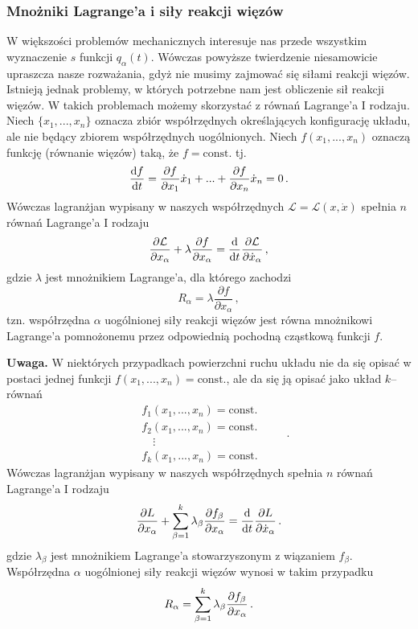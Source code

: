 \documentclass[../main.tex]{subfiles}
\begin{document}
\subsubsection{Mnożniki Lagrange'a i siły reakcji więzów}
W większości problemów mechanicznych interesuje nas przede wszystkim wyznaczenie \(s\) funkcji \(q_\alpha(t)\). Wówczas powyższe twierdzenie niesamowicie upraszcza nasze rozważania, gdyż nie musimy zajmować się siłami reakcji więzów. Istnieją jednak problemy, w których potrzebne nam jest obliczenie sił reakcji więzów. W takich problemach możemy skorzystać z równań Lagrange'a I rodzaju. Niech \(\{x_1,...,x_n\}\) oznacza zbiór współrzędnych określających konfigurację układu, ale nie będący zbiorem współrzędnych uogólnionych. Niech \(f(x_1,...,x_n)\) oznaczą funkcję (równanie więzów) taką, że \(f=\text{const.}\) tj.
\begin{equation*}
    \dv{f}{t}=\frac{\partial f}{\partial x_1}\dot x_1+...+\frac{\partial f}{\partial x_n}\dot x_n=0\,.
\end{equation*}
Wówczas lagranżjan wypisany w naszych współrzędnych \(\mathcal{L}=\mathcal{L}(x,\dot x)\) spełnia \(n\) równań Lagrange'a I rodzaju
\begin{equation*}
    \frac{\partial\mathcal{L}}{\partial x_\alpha}+\lambda \frac{\partial f}{\partial x_\alpha}=\dv{}{t}\frac{\partial \mathcal{L}}{\partial \dot{x}_\alpha}\,,
\end{equation*}
gdzie \(\lambda\) jest mnożnikiem Lagrange'a, dla którego zachodzi
\begin{equation*}
    R_\alpha=\lambda\frac{\partial f}{\partial x_\alpha}\,,
\end{equation*}
tzn. współrzędna \(\alpha\) uogólnionej siły reakcji więzów jest równa mnożnikowi Lagrange'a pomnożonemu przez odpowiednią pochodną cząstkową funkcji \(f\).
\medskip

\textbf{Uwaga.} W niektórych przypadkach powierzchni ruchu układu nie da się opisać w postaci jednej funkcji \(f(x_1,...,x_n)=\text{const.}\), ale da się ją opisać jako układ \(k\)--równań
\begin{equation*}
    \begin{split}
        &f_1(x_1,...,x_n)=\text{const.}\\
        &f_2(x_1,...,x_n)=\text{const.}\\
        &\quad\vdots\\
        &f_k(x_1,...,x_n)=\text{const.}
    \end{split}\quad\quad\,.
\end{equation*}
Wówczas lagranżjan wypisany w naszych współrzędnych spełnia \(n\) równań Lagrange'a I rodzaju
\begin{equation*}
    \pdv{L}{x_\alpha}+\sum_{\beta=1}^k\lambda_\beta\pdv{f_\beta}{x_\alpha}=\dv[]{}{t}\pdv{L}{\dot{x}_\alpha}\,.
\end{equation*}
gdzie \(\lambda_\beta\) jest mnożnikiem Lagrange'a stowarzyszonym z wiązaniem \(f_\beta\). Współrzędna \(\alpha\) uogólnionej siły reakcji więzów wynosi w takim przypadku
\begin{equation*}
    R_\alpha=\sum_{\beta=1}^k\lambda_\beta\pdv{f_\beta}{x_\alpha}\,.
\end{equation*}
\end{document}
